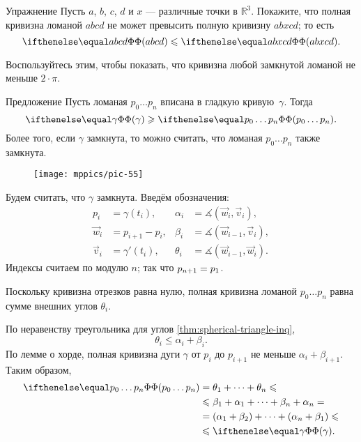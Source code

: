 \begin{thm}{Упражнение}\label{ex:monotonic-tc}
Пусть $a$, $b$, $c$, $d$ и $x$ --- различные точки в $\mathbb{R}^3$.
Покажите, что полная кривизна ломаной $abcd$ не может превысить полную кривизну $abxcd$; то есть 
\[\tc {abcd} \le \tc {abxcd}.\]

Воспользуйтесь этим, чтобы показать, что кривизна любой замкнутой ломаной не меньше $2\cdot\pi$.
\end{thm}

\begin{thm}{Предложение}\label{prop:inscribed-total-curvature}
Пусть ломаная $p_0\dots p_n$ вписана в гладкую кривую~$\gamma$.
Тогда 
\[\tc\gamma\ge \tc{p_0\dots p_n}.\]
Более того, если $\gamma$ замкнута, то можно считать, что ломаная $p_0\dots p_n$ также замкнута.

\end{thm}



\begin{wrapfigure}[7]{o}{40 mm}
\vskip-4mm
\centering
\texttt{[image: mppics/pic-55]}
\vskip0mm
\end{wrapfigure}


Будем считать, что $\gamma$ замкнута. 
Введём обозначения:
\begin{align*}
p_i&=\gamma(t_i),
&
\alpha_i&=\measuredangle(\vec w_i,\vec v_i),
\\
\vec w_i&=p_{i+1}-p_i,
& 
\beta_i&=\measuredangle(\vec w_{i-1},\vec v_i),
\\
\vec v_i&=\gamma'(t_i),
&
\theta_i&=\measuredangle(\vec w_{i-1},\vec w_i).
\end{align*}
Индексы считаем по модулю $n$;
так что $p_{n+1}\z=p_1$.

Поскольку кривизна отрезков равна нулю, 
полная кривизна ломаной $p_0\dots p_n$ равна сумме внешних углов $\theta_i$.

По неравенству треугольника для углов \ref{thm:spherical-triangle-inq}, 
\[\theta_i\le \alpha_i+\beta_i.\]
По лемме о хорде, полная кривизна дуги $\gamma$ от $p_i$ до $p_{i+1}$ не меньше $\alpha_i+\beta_{i+1}$. 
Таким образом, 
\begin{align*}
\tc{p_0\dots p_n}&=\theta_1+\dots+\theta_n\le 
\\
&\le\beta_1+\alpha_1+\dots+\beta_n+\alpha_n = 
\\
&=(\alpha_1+\beta_2)+\dots+(\alpha_n+\beta_1) \le 
\\
&\le \tc\gamma.
\end{align*}

